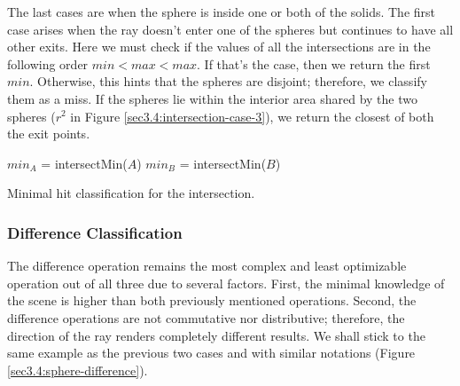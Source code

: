 \documentclass[a4paper,11pt,oneside]{article}
\begin{document}
The last cases are when the sphere is inside one or both of the solids. The first case arises when the ray doesn't enter one of the spheres but continues to have all other exits. Here we must check if the values of all the intersections are in the following order $min < max < max$. If that's the case, then we return the first $min$. Otherwise, this hints that the spheres are disjoint; therefore, we classify them as a miss. If the spheres lie within the interior area shared by the two spheres ($r^2$ in Figure \ref{sec3.4:intersection-case-3}), we return the closest of both the exit points.

\begin{algorithm}
	\SetAlgoLined
	$min_A$ = intersectMin($A$)\;
	$min_B$ = intersectMin($B$)\;
	\caption{Minimal hit classification for the intersection.}
	\label{sec3.4:intersection_algo}
\end{algorithm}

\subsubsection{Difference Classification}
\label{section:minimal_difference_classficiation}

The difference operation remains the most complex and least optimizable operation out of all three due to several factors. First, the minimal knowledge of the scene is higher than both previously mentioned operations. Second, the difference operations are not commutative nor distributive; therefore, the direction of the ray renders completely different results. We shall stick to the same example as the previous two cases and with similar notations (Figure \ref{sec3.4:sphere-difference}).
\end{document}
